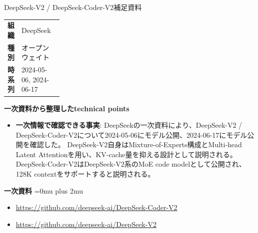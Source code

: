 \Needspace{0.38\textheight}
\begin{technicalnote}{DeepSeek-V2 / DeepSeek-Coder-V2}{補足資料}
\begingroup
\begin{tabularx}{\linewidth}{@{}>{\bfseries}p{0.22\linewidth}X@{}}
組織 & DeepSeek \\
種別 & オープンウェイト \\
時系列 & 2024-05-06, 2024-06-17 \\
\end{tabularx}
\smallskip
\begin{minipage}{\linewidth}
{\bfseries 一次資料から整理したtechnical points}
\begin{itemize}[leftmargin=1.5em,itemsep=0.35em]
\item \textbf{一次情報で確認できる事実}: DeepSeekの一次資料により、DeepSeek-V2 / DeepSeek-Coder-V2について2024-05-06にモデル公開、2024-06-17にモデル公開を確認した。 DeepSeek-V2自身はMixture-of-Experts構成とMulti-head Latent Attentionを用い、KV-cache量を抑える設計として説明される。DeepSeek-Coder-V2はDeepSeek-V2系のMoE code modelとして公開され、128K contextをサポートすると説明される。
\end{itemize}
\begin{minipage}{\linewidth}
\begin{samepage}
{\bfseries 一次資料}
\begingroup\sloppy
\Urlmuskip=0mu plus 2mu\relax
\begin{itemize}[leftmargin=1.5em,itemsep=0.25em]
\item {\scriptsize\url{https://github.com/deepseek-ai/DeepSeek-Coder-V2}}
\item {\scriptsize\url{https://github.com/deepseek-ai/DeepSeek-V2}}
\end{itemize}
\endgroup
\end{samepage}
\end{minipage}
\end{minipage}
\endgroup
\end{technicalnote}
\medskip
